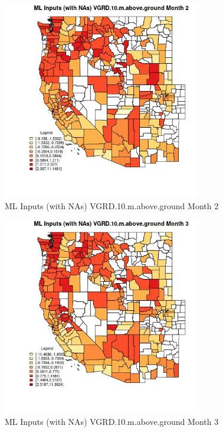 \begin{figure} 
\centering  
\includegraphics[width=0.77\textwidth]{Code_Outputs/Report_ML_input_PM25_Step4_part_f_de_duplicated_aveswNAs_CountyVGRD10mabovegroundmedianMonth2.jpg} 
\caption{\label{fig:Report_ML_input_PM25_Step4_part_f_de_duplicated_aveswNAsCountyVGRD10mabovegroundmedianMonth2}ML Inputs (with NAs) VGRD.10.m.above.ground Month 2} 
\end{figure} 
 

\begin{figure} 
\centering  
\includegraphics[width=0.77\textwidth]{Code_Outputs/Report_ML_input_PM25_Step4_part_f_de_duplicated_aveswNAs_CountyVGRD10mabovegroundmedianMonth3.jpg} 
\caption{\label{fig:Report_ML_input_PM25_Step4_part_f_de_duplicated_aveswNAsCountyVGRD10mabovegroundmedianMonth3}ML Inputs (with NAs) VGRD.10.m.above.ground Month 3} 
\end{figure} 
 

